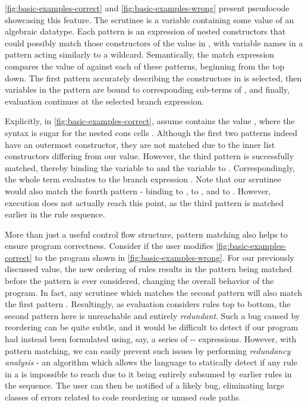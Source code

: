 \autoref{fig:basic-examples-correct} and \autoref{fig:basic-examples-wrong} present pseudocode showcasing this feature. The scrutinee is a variable  containing some value of an algebraic datatype. Each pattern is an expression of nested constructors that could possibly match those constructors of the value in , with variable names in a pattern acting similarly to a wildcard. Semantically, the match expression compares the value of  against each of these patterns, beginning from the top down. The first pattern accurately describing the constructors in  is selected, then variables in the pattern are bound to corresponding sub-terms of , and finally, evaluation continues at the selected branch expression. 

Explicitly, in \autoref{fig:basic-examples-correct}, assume  contains the value , where the syntax \li{[x , y]} is sugar for the nested cons cells . Although the first two patterns indeed have an outermost  constructor, they are not matched due to the inner list constructors differing from our value. However, the third pattern  is successfully matched, thereby binding the variable  to  and the variable  to . Correspondingly, the whole term evaluates to the branch expression . Note that our scrutinee would also match the fourth pattern  - binding  to ,  to , and  to \li{[]}. However, execution does not actually reach this point, as the third pattern is matched earlier in the rule sequence.

More than just a useful control flow structure, pattern matching also helps to ensure program correctness. Consider if  the user modifies \autoref{fig:basic-examples-correct} to the program shown in \autoref{fig:basic-examples-wrong}. For our previously discussed value, the new ordering of rules results in the pattern  being matched before the pattern  is ever considered, changing the overall behavior of the program. In fact, any scrutinee which matches the second pattern  will also match the first pattern . Resultingly, as evaluation considers rules top to bottom, the second pattern here is unreachable and entirely \emph{redundant}. Such a bug caused by reordering can be quite subtle, and it would be difficult to detect if our program had instead been formulated using, say, a series of -- expressions. However, with pattern matching, we can easily prevent such issues by performing \emph{redundancy analysis} -  an algorithm which allows the language to statically detect if any rule in a  is impossible to reach due to it being entirely subsumed by earlier rules in the sequence. The user can then be notified of a likely bug, eliminating large classes of errors related to code reordering or unused code paths.


